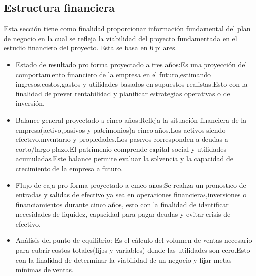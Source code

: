 
\subsection{Estructura financiera}
Esta sección tiene como finalidad proporcionar información fundamental del plan de negocio en la cual se refleja la viabilidad del proyecto fundamentada en el estudio financiero del proyecto. Esta se basa en 6 pilares.
\begin{itemize}
    \item Estado de resultado pro forma proyectado a tres años:Es una proyección del comportamiento financiero de la empresa en el futuro,estimando ingresos,costos,gastos y utilidades basados en supuestos realistas.Esto con la finalidad de prever rentabilidad y planificar estrategias operativas o de inversión.
    \item Balance general proyectado a cinco años:Refleja la situación financiera de la empresa(activo,pasivos y patrimonios)a cinco años.Los activos siendo efectivo,inventario y propiedades.Los pasivos corresponden a deudas a corto/largo plazo.El patrimonio comprende capital social y utilidades acumuladas.Este balance permite evaluar la solvencia y la capacidad de crecimiento de la empresa a futuro.
    \item Flujo de caja pro-forma proyectado a cinco años:Se realiza un pronostico de entradas y salidas de efectivo ya sea en operaciones financieras,inversiones o financiamientos durante cinco años, esto con la finalidad de identificar necesidades de liquidez, capacidad para pagar deudas y evitar crisis de efectivo.
    \item Análisis del punto de equilibrio: Es el cálculo del volumen de ventas necesario para cubrir costos totales(fijos y variables) donde las utilidades son cero.Esto con la finalidad de determinar la viabilidad de un negocio y fijar metas mínimas de ventas.
\end{itemize} 


